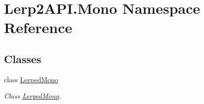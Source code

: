 \hypertarget{namespace_lerp2_a_p_i_1_1_mono}{}\section{Lerp2\+A\+P\+I.\+Mono Namespace Reference}
\label{namespace_lerp2_a_p_i_1_1_mono}
\subsection*{Classes}
\begin{DoxyCompactItemize}
\item 
class \hyperlink{class_lerp2_a_p_i_1_1_mono_1_1_lerped_mono}{Lerped\+Mono}
\begin{DoxyCompactList}\small\item\em Class \hyperlink{class_lerp2_a_p_i_1_1_mono_1_1_lerped_mono}{Lerped\+Mono}. \end{DoxyCompactList}\end{DoxyCompactItemize}
